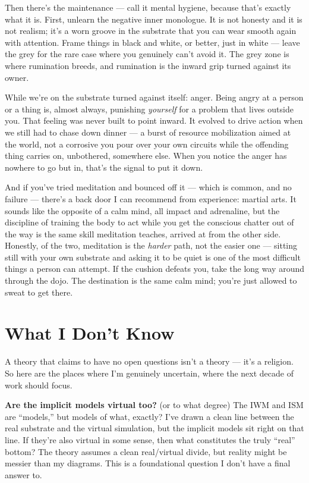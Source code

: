 \documentclass[11pt, twoside, openright]{book}
\begin{document}
Then there's the maintenance --- call it mental hygiene, because that's exactly what it is. First, unlearn the negative inner monologue. It is not honesty and it is not realism; it's a worn groove in the substrate that you can wear smooth again with attention. Frame things in black and white, or better, just in white --- leave the grey for the rare case where you genuinely can't avoid it. The grey zone is where rumination breeds, and rumination is the inward grip turned against its owner.

While we're on the substrate turned against itself: anger. Being angry at a person or a thing is, almost always, punishing \textit{yourself} for a problem that lives outside you. That feeling was never built to point inward. It evolved to drive action when we still had to chase down dinner --- a burst of resource mobilization aimed at the world, not a corrosive you pour over your own circuits while the offending thing carries on, unbothered, somewhere else. When you notice the anger has nowhere to go but in, that's the signal to put it down.

And if you've tried meditation and bounced off it --- which is common, and no failure --- there's a back door I can recommend from experience: martial arts. It sounds like the opposite of a calm mind, all impact and adrenaline, but the discipline of training the body to act while you get the conscious chatter out of the way is the same skill meditation teaches, arrived at from the other side. Honestly, of the two, meditation is the \textit{harder} path, not the easier one --- sitting still with your own substrate and asking it to be quiet is one of the most difficult things a person can attempt. If the cushion defeats you, take the long way around through the dojo. The destination is the same calm mind; you're just allowed to sweat to get there.

\section*{What I Don't Know}

A theory that claims to have no open questions isn't a theory --- it's a religion. So here are the places where I'm genuinely uncertain, where the next decade of work should focus.

\textbf{Are the implicit models virtual too?} (or to what degree) The IWM and ISM are ``models,'' but models of what, exactly? I've drawn a clean line between the real substrate and the virtual simulation, but the implicit models sit right on that line. If they're also virtual in some sense, then what constitutes the truly ``real'' bottom? The theory assumes a clean real/\allowbreak{}virtual divide, but reality might be messier than my diagrams. This is a foundational question I don't have a final answer to.
\end{document}
